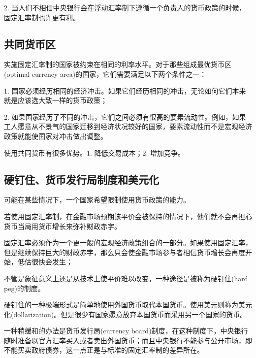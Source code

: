 \documentclass{article}
\begin{document}
2. 当人们不相信中央银行会在浮动汇率制下遵循一个负责人的货币政策的时候，固定汇率制也许更有利。

\subsection{共同货币区}

实施固定汇率制的国家被约束在相同的利率水平。对于那些组成最优货币区(optimal currency area)的国家，它们需要满足以下两个条件之一：

1. 国家必须经历相同的经济冲击。如果它们经历相同的冲击，无论如何它们本来就是应该选大致一样的货币政策；

2. 如果国家经历了不同的冲击，它们之间必须有很高的要素流动性。例如，如果工人愿意从不景气的国家迁移到经济状况较好的国家，要素流动性而不是宏观经济政策就能使国家对冲击做出调整。

使用共同货币有很多优势。1. 降低交易成本；2. 增加竞争。

\subsection{硬钉住、货币发行局制度和美元化}

可能在某些情况下，一个国家希望限制使用货币政策的能力。

若使用固定汇率制，在金融市场预期该平价会被保持的情况下，他们就不会再担心货币当局用货币增长来弥补财政赤字。

\hspace*{\fill}

固定汇率必须作为一个更一般的宏观经济政策组合的一部分。如果使用固定汇率，但是继续保持巨大的财政赤字，那么只会使金融市场参与者相信货币增长会再度开始，低估很快会发生；

不管是象征意义上还是从技术上使平价难以改变，一种途径是被称为硬钉住(hard peg)的制度。

\hspace*{\fill}

硬钉住的一种极端形式是简单地使用外国货币取代本国货币。使用美元则称为美元化(dollarization)。但是很少有国家愿意放弃本国货币而采用另一个国家的货币。

一种稍缓和的办法是货币发行局(currency board)制度，在这种制度下，中央银行随时准备以官方汇率买入或者卖出外国货币；而且中央银行不能参与公开市场，即不能买卖政府债券，这一点正是与标准的固定汇率制的差异所在。
\end{document}
